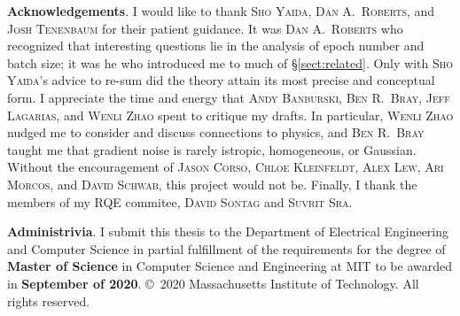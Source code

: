 \documentclass[openany, notitlepage, justified]{tufte-book}
\theoremstyle{plain}
\theoremstyle{definition}
\begin{document}
    \vspace{0.5cm}
    \textbf{Acknowledgements}.
        I would like to thank \textsc{Sho Yaida}, \textsc{Dan A.\ Roberts},
        and \textsc{Josh Tenenbaum} for their patient guidance.
        It was \textsc{Dan A.\ Roberts} who recognized that interesting
        questions lie in the analysis of epoch number and batch size; it was he
        who introduced me to much of \S\ref{sect:related}.  Only with
        \textsc{Sho Yaida}'s advice to re-sum did the theory attain its most
        precise and conceptual form.
        I appreciate the time and energy that \textsc{Andy Banburski},
        \textsc{Ben R.\ Bray}, \textsc{Jeff Lagarias}, and \textsc{Wenli Zhao}
        spent to critique my drafts.  In particular, \textsc{Wenli Zhao}
        nudged me to consider and discuss connections to physics, and
        \textsc{Ben R.\ Bray} taught me that gradient noise is rarely istropic,
        homogeneous, or Gaussian.  
        Without the encouragement of \textsc{Jason Corso}, \textsc{Chloe
        Kleinfeldt}, \textsc{Alex Lew}, \textsc{Ari Morcos}, and \textsc{David
        Schwab}, this project would not be.
        Finally, I thank the members of my RQE commitee,
        \textsc{David Sontag} and \textsc{Suvrit Sra}.

    \vspace{0.5cm}
    \textbf{Administrivia}.
        I submit this thesis to the Department of Electrical Engineering and
        Computer Science in partial fulfillment of the requirements for the
        degree of \textbf{Master of Science} in Computer Science and
        Engineering at MIT to be awarded in \textbf{September of 2020}.
        \hfill
        \copyright~2020 Massachusetts Institute of Technology. All rights
        reserved.

    \vspace{1.5cm}

    \newcommand{\sss}{\hspace*{\fill}}
    \newcommand{\apeecs}{Associate Professor, EECS}
    \newcommand{\pbcs}{Professor, BCS}
    \newcommand{\bs}{B.A.\ (U.\ Michigan, 2018)}
    \newcommand{\rqecp}{RQE Committee Person}
\end{document}
